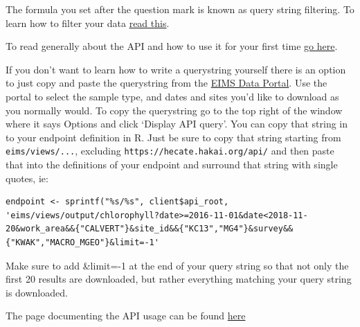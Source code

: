 \documentclass[]{book}
\begin{document}
The formula you set after the question mark is known as query string
filtering. To learn how to filter your data
\href{https://github.com/HakaiInstitute/hakai-api/blob/master/docs/querying-data.md}{read
this}.

To read generally about the API and how to use it for your first time
\href{https://github.com/HakaiInstitute/hakai-api/blob/master/docs/simplified-api-documentation.md\#what-is-the-hakai-api}{go
here}.

If you don't want to learn how to write a querystring yourself there is
an option to just copy and paste the querystring from the
\href{https://hecate.hakai.org/portal2/}{EIMS Data Portal}. Use the
portal to select the sample type, and dates and sites you'd like to
download as you normally would. To copy the querystring go to the top
right of the window where it says Options and click `Display API query'.
You can copy that string in to your endpoint definition in R. Just be
sure to copy that string starting from \texttt{eims/views/...},
excluding \texttt{https://hecate.hakai.org/api/} and then paste that
into the definitions of your endpoint and surround that string with
single quotes, ie:

\begin{verbatim}
endpoint <- sprintf("%s/%s", client$api_root, 'eims/views/output/chlorophyll?date>=2016-11-01&date<2018-11-20&work_area&&{"CALVERT"}&site_id&&{"KC13","MG4"}&survey&&{"KWAK","MACRO_MGEO"}&limit=-1'
\end{verbatim}

Make sure to add \&limit=-1 at the end of your query string so that not
only the first 20 results are downloaded, but rather everything matching
your query string is downloaded.

The page documenting the API usage can be found
\href{https://hakaiinstitute.github.io/hakai-api/}{here}
\end{document}
